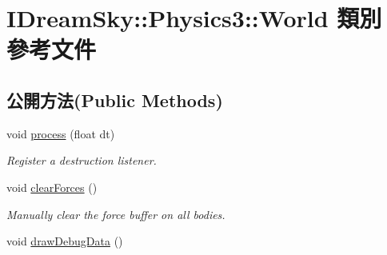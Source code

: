 \hypertarget{class_i_dream_sky_1_1_physics3_1_1_world}{}\section{I\+Dream\+Sky\+:\+:Physics3\+:\+:World 類別 參考文件}
\label{class_i_dream_sky_1_1_physics3_1_1_world}
\subsection*{公開方法(Public Methods)}
\begin{DoxyCompactItemize}
\item 
void \hyperlink{class_i_dream_sky_1_1_physics3_1_1_world_a5450ef69be5442f660105ba3d49494b0}{process} (float dt)
\begin{DoxyCompactList}\small\item\em Register a destruction listener. \end{DoxyCompactList}\item 
void \hyperlink{class_i_dream_sky_1_1_physics3_1_1_world_a9687ff7ba01724c4d822645be2c92af4}{clear\+Forces} ()
\begin{DoxyCompactList}\small\item\em Manually clear the force buffer on all bodies. \end{DoxyCompactList}\item 
void \hyperlink{class_i_dream_sky_1_1_physics3_1_1_world_a8a1ae57ab85cb2d604b34cb26ba92e20}{draw\+Debug\+Data} ()\hypertarget{class_i_dream_sky_1_1_physics3_1_1_world_a8a1ae57ab85cb2d604b34cb26ba92e20}{}\label{class_i_dream_sky_1_1_physics3_1_1_world_a8a1ae57ab85cb2d604b34cb26ba92e20}


\end{DoxyCompactItemize}
